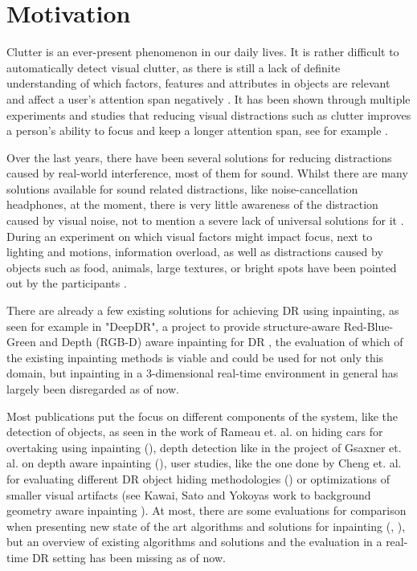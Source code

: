\section{Motivation}
Clutter is an ever-present phenomenon in our daily lives. It is rather difficult to automatically detect visual clutter, as there is still a lack of definite understanding of which factors, features and attributes in objects are relevant and affect a user's attention span negatively \cite{RosenholtzRuth2007Mvc}. It has been shown through multiple experiments and studies that reducing visual distractions such as clutter improves a person's ability to focus and keep a longer attention span, see for example \cite{MaXiaojin2023VDSL}.

Over the last years, there have been several solutions for reducing distractions caused by real-world interference, most of them for sound.
Whilst there are many solutions available for sound related distractions, like noise-cancellation headphones, at the moment, there is very little awareness of the distraction caused by visual noise, not to mention a severe lack of universal solutions for it \cite{HongJunlei2024VNCE}. During an experiment on which visual factors might impact focus, next to lighting and motions, information overload, as well as distractions caused by objects such as food, animals, large textures, or bright spots have been pointed out by the participants \cite{HongJunlei2024VNCE}.

There are already a few existing solutions for achieving DR using inpainting, as seen for example in "DeepDR", a project to provide structure-aware Red-Blue-Green and Depth (RGB-D) aware inpainting for DR \cite{GsaxnerChristina2024DDSR}, the evaluation of which of the existing inpainting methods is viable and could be used for not only this domain, but inpainting in a 3-dimensional real-time environment in general has largely been disregarded as of now.

Most publications put the focus on different components of the system, like the detection of objects, as seen in the work of Rameau et. al. on hiding cars for overtaking using inpainting (\cite{RameauFrancois2016ARAR}), depth detection like in the project of Gsaxner et. al. on depth aware inpainting (\cite{GsaxnerChristina2024DDSR}), user studies, like the one done by Cheng et. al. for evaluating different DR object hiding methodologies (\cite{ChengYiFei2022TUDR}) or optimizations of smaller visual artifacts (see Kawai, Sato and Yokoyas work to background geometry aware inpainting \cite{KawaiNorihiko2016DRBo}). At most, there are some evaluations for comparison when presenting new state of the art algorithms and solutions for inpainting (\cite{DingRam2019}, \cite{MuziHao2023}), but an overview of existing algorithms and solutions and the evaluation in a real-time DR setting has been missing as of now.

